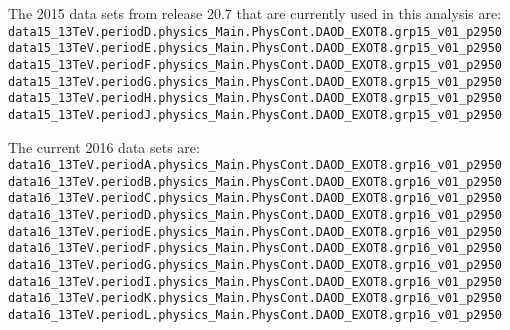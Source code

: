 The 2015 data sets from release 20.7 that are currently used in this analysis are:
\noindent
\\
{\scriptsize
\verb|data15_13TeV.periodD.physics_Main.PhysCont.DAOD_EXOT8.grp15_v01_p2950|\\
\verb|data15_13TeV.periodE.physics_Main.PhysCont.DAOD_EXOT8.grp15_v01_p2950|\\
\verb|data15_13TeV.periodF.physics_Main.PhysCont.DAOD_EXOT8.grp15_v01_p2950|\\
\verb|data15_13TeV.periodG.physics_Main.PhysCont.DAOD_EXOT8.grp15_v01_p2950|\\
\verb|data15_13TeV.periodH.physics_Main.PhysCont.DAOD_EXOT8.grp15_v01_p2950|\\
\verb|data15_13TeV.periodJ.physics_Main.PhysCont.DAOD_EXOT8.grp15_v01_p2950|
}

The current 2016 data sets are:
\noindent
\\
{\scriptsize
\verb|data16_13TeV.periodA.physics_Main.PhysCont.DAOD_EXOT8.grp16_v01_p2950|\\
\verb|data16_13TeV.periodB.physics_Main.PhysCont.DAOD_EXOT8.grp16_v01_p2950|\\
\verb|data16_13TeV.periodC.physics_Main.PhysCont.DAOD_EXOT8.grp16_v01_p2950|\\
\verb|data16_13TeV.periodD.physics_Main.PhysCont.DAOD_EXOT8.grp16_v01_p2950|\\
\verb|data16_13TeV.periodE.physics_Main.PhysCont.DAOD_EXOT8.grp16_v01_p2950|\\
\verb|data16_13TeV.periodF.physics_Main.PhysCont.DAOD_EXOT8.grp16_v01_p2950|\\
\verb|data16_13TeV.periodG.physics_Main.PhysCont.DAOD_EXOT8.grp16_v01_p2950|\\
\verb|data16_13TeV.periodI.physics_Main.PhysCont.DAOD_EXOT8.grp16_v01_p2950|\\
\verb|data16_13TeV.periodK.physics_Main.PhysCont.DAOD_EXOT8.grp16_v01_p2950|\\
\verb|data16_13TeV.periodL.physics_Main.PhysCont.DAOD_EXOT8.grp16_v01_p2950|
}


\clearpage
